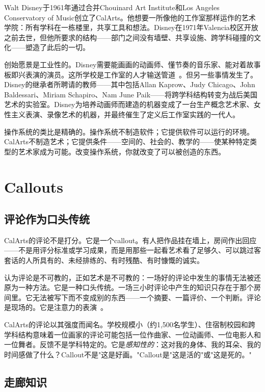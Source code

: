 \documentclass[10pt,letterpaper,twocolumn]{article}
\begin{document}
Walt Disney于1961年通过合并Chouinard Art Institute和Los Angeles Conservatory of Music创立了CalArts。他想要一所像他的工作室那样运作的艺术学院：所有学科在一栋楼里，共享工具和想法。Disney在1971年Valencia校区开放之前去世，但他所要求的结构——部门之间没有墙壁、共享设施、跨学科碰撞的文化——塑造了此后的一切。

创始愿景是工业性的。Disney需要能画画的动画师、懂节奏的音乐家、能对着故事板即兴表演的演员。这所学校是工作室的人才输送管道~\citep{singerman1999art}。但另一些事情发生了。Disney的继承者所聘请的教师——其中包括Allan Kaprow、Judy Chicago、John Baldessari、Miriam Schapiro、Nam June Paik——将跨学科结构转变为战后美国艺术的实验室。Disney为培养动画师而建造的机器变成了一台生产概念艺术家、女性主义表演、录像艺术的机器，并最终催生了定义后工作室实践的一代人。

操作系统的类比是精确的。操作系统不制造软件；它提供软件可以运行的环境。CalArts不制造艺术；它提供条件——空间的、社会的、教学的——使某种特定类型的艺术家成为可能。改变操作系统，你就改变了可以被创造的东西。

\section{Callouts}

\subsection{评论作为口头传统}

CalArts的评论不是打分。它是一个callout。有人把作品挂在墙上，房间作出回应——不是用评分标准或学习成果，而是用那些一起看艺术看了足够久、可以跳过客套话的人所具有的、未经排练的、有时残酷、有时慷慨的诚实。

\citet{elkins2001why}认为评论是不可教的，正如艺术是不可教的：一场好的评论中发生的事情无法被还原为一种方法。它是一种口头传统。一场三小时评论中产生的知识只存在于那个房间里。它无法被写下而不变成别的东西——一个摘要、一篇评价、一个判断。评论是现场的。它是注意力的表演~\citep{hooks1994teaching}。

CalArts的评论以其强度而闻名。学校规模小（约1,500名学生）、住宿制校园和跨学科结构意味着一位画家的评论可能包括一位作曲家、一位动画师、一位电影人和一位舞者。反馈不是学科特定的。它是\emph{感知性的}：这对我的身体、我的耳朵、我的时间感做了什么？Callout不是"这是好画。"Callout是"这是活的"或"这是死的。"

\subsection{走廊知识}
\end{document}
